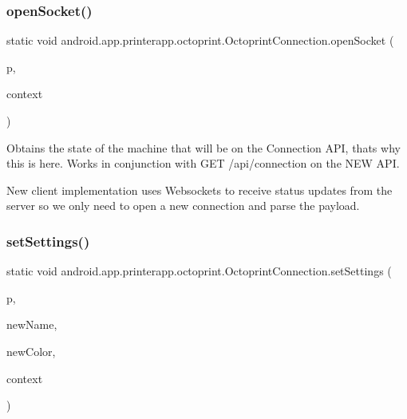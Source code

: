 \mbox{\label{classandroid_1_1app_1_1printerapp_1_1octoprint_1_1_octoprint_connection_a5e4e16d3f4131c9fac795d701d6856ea}} 
\subsubsection{\texorpdfstring{open\+Socket()}{openSocket()}}
{\footnotesize\ttfamily static void android.\+app.\+printerapp.\+octoprint.\+Octoprint\+Connection.\+open\+Socket (\begin{DoxyParamCaption}\item[{final \hyperlink{classandroid_1_1app_1_1printerapp_1_1model_1_1_model_printer}{Model\+Printer}}]{p,  }\item[{final Context}]{context }\end{DoxyParamCaption})\hspace{0.3cm}{\ttfamily [static]}}

Obtains the state of the machine that will be on the Connection A\+PI, that\textquotesingle{}s why this is here. Works in conjunction with G\+ET /api/connection on the N\+EW A\+PI.

New client implementation uses Websockets to receive status updates from the server so we only need to open a new connection and parse the payload. \mbox{\label{classandroid_1_1app_1_1printerapp_1_1octoprint_1_1_octoprint_connection_a6890bc490ac28e4c7929ed68b8a54dc3}} 
\subsubsection{\texorpdfstring{set\+Settings()}{setSettings()}}
{\footnotesize\ttfamily static void android.\+app.\+printerapp.\+octoprint.\+Octoprint\+Connection.\+set\+Settings (\begin{DoxyParamCaption}\item[{final \hyperlink{classandroid_1_1app_1_1printerapp_1_1model_1_1_model_printer}{Model\+Printer}}]{p,  }\item[{String}]{new\+Name,  }\item[{final String}]{new\+Color,  }\item[{Context}]{context }\end{DoxyParamCaption})\hspace{0.3cm}{\ttfamily [static]}}

